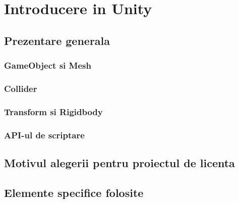 \documentclass[12pt, a4paper]{article}
\begin{document}
	
	
	\section{Introducere in Unity}
	
	
	
	
	
	\subsection{Prezentare generala}
	
	
	
	
	
	\subsubsection{GameObject si Mesh}
	
	
	
	
	
	\subsubsection{Collider}
	
	
	
	
	
	\subsubsection{Transform si Rigidbody}
	
	
	
	
	
	\subsubsection{API-ul de scriptare}
	
	
	
	
	
	\subsection{Motivul alegerii pentru proiectul de licenta}





	\subsection{Elemente specifice folosite}	
	
	
	
\end{document}
